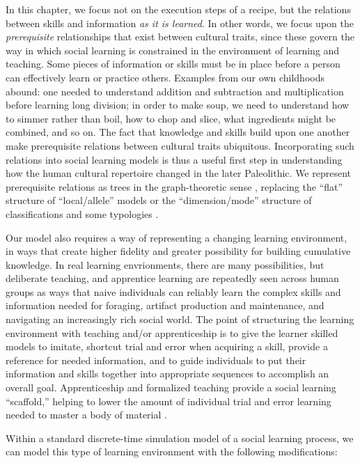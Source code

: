 \documentclass[graybox,natbib]{svmult}
\begin{document}
In this chapter, we focus not on the execution steps of a recipe, but
the relations between skills and information \emph{as it is learned}. In
other words, we focus upon the \emph{prerequisite} relationships that
exist between cultural traits, since these govern the way in which
social learning is constrained in the environment of learning and
teaching. Some pieces of information or skills must be in place before a
person can effectively learn or practice others. Examples from our own
childhoods abound: one needed to understand addition and subtraction and
multiplication before learning long division; in order to make soup, we
need to understand how to simmer rather than boil, how to chop and
slice, what ingredients might be combined, and so on. The fact that
knowledge and skills build upon one another make prerequisite relations
between cultural traits ubiquitous. Incorporating such relations into
social learning models is thus a useful first step in understanding how
the human cultural repertoire changed in the later Paleolithic. We
represent prerequisite relations as trees in the graph-theoretic sense
\citep{diestel2010graph}, replacing the ``flat'' structure of
``local/allele'' models or the ``dimension/mode'' structure of
classifications and some typologies \citep{Dunnell1971}.

Our model also requires a way of representing a changing learning
environment, in ways that create higher fidelity and greater possibility
for building cumulative knowledge. In real learning envrionments, there
are many possibilities, but deliberate teaching, and apprentice learning
are repeatedly seen across human groups as ways that naive individuals
can reliably learn the complex skills and information needed for
foraging, artifact production and maintenance, and navigating an
increasingly rich social world. The point of structuring the learning
environment with teaching and/or apprenticeship is to give the learner
skilled models to imitate, shortcut trial and error when acquiring a
skill, provide a reference for needed information, and to guide
individuals to put their information and skills together into
appropriate sequences to accomplish an overall goal. Apprenticeship and
formalized teaching provide a social learning ``scaffold,'' helping to
lower the amount of individual trial and error learning needed to master
a body of material \citep{wimsatt2007reproducing, wimsatt2007re}.

Within a standard discrete-time simulation model of a social learning
process, we can model this type of learning environment with the
following modifications:
\end{document}
